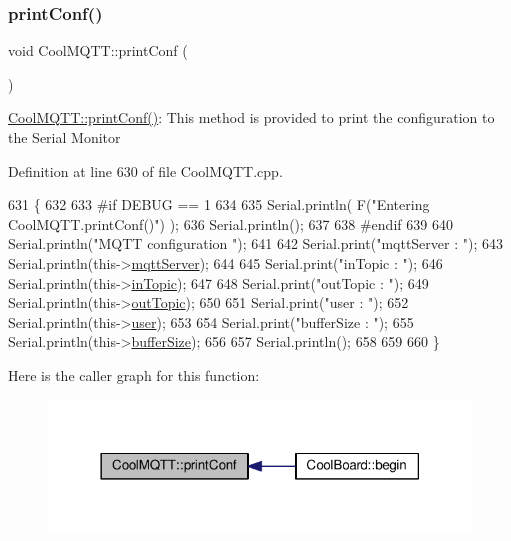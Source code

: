 \subsubsection{\texorpdfstring{print\+Conf()}{printConf()}}
{\footnotesize\ttfamily void Cool\+M\+Q\+T\+T\+::print\+Conf (\begin{DoxyParamCaption}{ }\end{DoxyParamCaption})}

\hyperlink{class_cool_m_q_t_t_a40553a0ad4b5ecf1cb4411ab54ca85fb}{Cool\+M\+Q\+T\+T\+::print\+Conf()}\+: This method is provided to print the configuration to the Serial Monitor 

Definition at line 630 of file Cool\+M\+Q\+T\+T.\+cpp.


\begin{DoxyCode}
631 \{
632 
633 \textcolor{preprocessor}{#if DEBUG == 1 }
634 
635     Serial.println( F(\textcolor{stringliteral}{"Entering CoolMQTT.printConf()"}) );
636     Serial.println();   
637 
638 \textcolor{preprocessor}{#endif}
639     
640     Serial.println(\textcolor{stringliteral}{"MQTT configuration "});
641 
642     Serial.print(\textcolor{stringliteral}{"mqttServer : "});
643     Serial.println(this->\hyperlink{class_cool_m_q_t_t_ab8bb951f87ddbf92db74c2ad16a3e53e}{mqttServer});
644 
645     Serial.print(\textcolor{stringliteral}{"inTopic : "});
646     Serial.println(this->\hyperlink{class_cool_m_q_t_t_a4492f52a441e83cc5151010317fdb52d}{inTopic});
647 
648     Serial.print(\textcolor{stringliteral}{"outTopic : "});
649     Serial.println(this->\hyperlink{class_cool_m_q_t_t_a109c786a17b463f9eeba046194279522}{outTopic});
650 
651     Serial.print(\textcolor{stringliteral}{"user : "});
652     Serial.println(this->\hyperlink{class_cool_m_q_t_t_a8cd47e45d457f908d4b4390b35aaee83}{user});
653 
654     Serial.print(\textcolor{stringliteral}{"bufferSize : "});
655     Serial.println(this->\hyperlink{class_cool_m_q_t_t_a7f3cf26b51d6770f216e42c5ef13ca9f}{bufferSize});
656 
657     Serial.println();
658 
659 
660 \}
\end{DoxyCode}
Here is the caller graph for this function\+:\nopagebreak
\begin{figure}[H]
\begin{center}
\leavevmode
\includegraphics[width=318pt]{d0/dd0/class_cool_m_q_t_t_a40553a0ad4b5ecf1cb4411ab54ca85fb_icgraph}
\end{center}
\end{figure}
\mbox{\label{class_cool_m_q_t_t_ace977b3e90ab14b1199fe5c4fb0a13ec}} 
